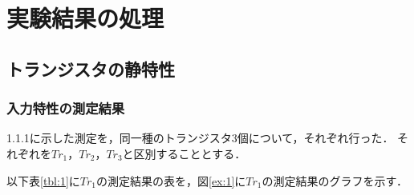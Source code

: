 \documentclass[10pt, a4j, dvipdfmx]{jarticle}
\begin{document}
    \newpage
    \section{実験結果の処理}
    \subsection{トランジスタの静特性}

    \subsubsection{入力特性の測定結果}
    1.1.1に示した測定を，同一種のトランジスタ3個について，それぞれ行った．
    それぞれを$Tr_1$，$Tr_2$，$Tr_3$と区別することとする．

    以下表\ref{tbl:1}に$Tr_1$の測定結果の表を，図\ref{ex:1}に$Tr_1$の測定結果のグラフを示す．
\end{document}
